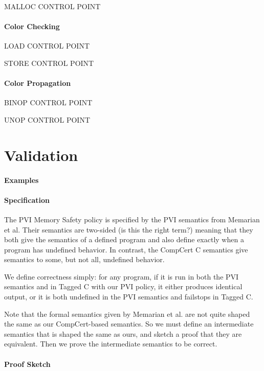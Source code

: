 \documentclass{article}
\begin{document}
MALLOC CONTROL POINT

\paragraph*{Color Checking}

LOAD CONTROL POINT

\trule{\vt}{\loadt{}{}{}{}}

 \longrightarrow {}

 \longrightarrow {}

STORE CONTROL POINT

\paragraph*{Color Propagation}

BINOP CONTROL POINT

UNOP CONTROL POINT

\section{Validation}

\paragraph*{Examples}

\paragraph*{Specification}

The PVI Memory Safety policy is specified by the PVI semantics from Memarian et al.
Their semantics are two-sided (is this the right term?) meaning that they both give
the semantics of a defined program and also define exactly when a program has
undefined behavior. In contrast, the CompCert C semantics give semantics to some,
but not all, undefined behavior.

We define correctness simply: for any program, if it is run in both the PVI semantics
and in Tagged C with our PVI policy, it either produces identical output, or it is both
undefined in the PVI semantics and failstops in Tagged C.

Note that the formal semantics given by Memarian et al. are not quite shaped the same
as our CompCert-based semantics. So we must define an intermediate semantics that is
shaped the same as ours, and sketch a proof that they are equivalent.
Then we prove the intermediate semantics to be correct.

\paragraph*{Proof Sketch}
\end{document}
